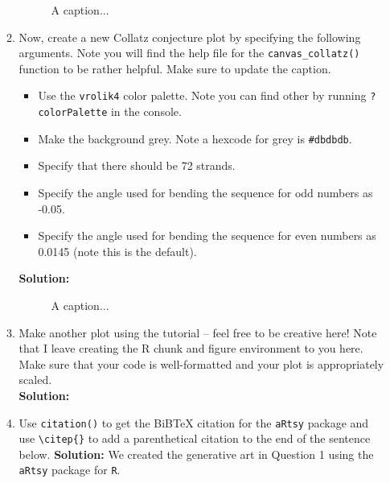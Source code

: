 \documentclass{article}\usepackage[]{graphicx}\usepackage[]{xcolor}
\begin{document}
\begin{enumerate}
\begin{enumerate}
\begin{figure}[H]
\begin{center}
\caption{A caption...}
\label{CollatzPlot2}
\end{center}
\end{figure}
  \item Now, create a new Collatz conjecture plot by specifying the following 
arguments. Note you will find the help file for the \texttt{canvas\_collatz()} 
function to be rather helpful. Make sure to update the caption.
\begin{itemize}
\item Use the \texttt{vrolik4} color palette. Note you can find other by running 
\texttt{?colorPalette} in the console.
\item Make the background grey. Note a hexcode for grey is \texttt{\#dbdbdb}.
  \item Specify that there should be 72 strands.
  \item Specify the angle used for bending the sequence for odd numbers as -0.05.
  \item Specify the angle used for bending the sequence for even numbers as 0.0145 
  (note this is the default).
  \end{itemize}
  \textbf{Solution:}

  \begin{figure}[H]
  \begin{center}
    \caption{A caption...}
  \label{CollatzPlot3}
  \end{center}
  \end{figure}
    \item Make another plot using the tutorial -- feel free to be creative here! 
    Note that I leave creating the R chunk and figure environment to you here. 
  Make sure that your code is well-formatted and your plot is appropriately scaled.\\
  \textbf{Solution:}
    \item Use \texttt{citation()} to get the BiBTeX citation for the \texttt{aRtsy}
  package and use \verb|\citep{}| to add a parenthetical citation to the end of
  the sentence below.
  \textbf{Solution:} We created the generative art in Question 1 using the \texttt{aRtsy}
  package for \texttt{R}.
  \end{enumerate}
\end{enumerate}
\end{document}
